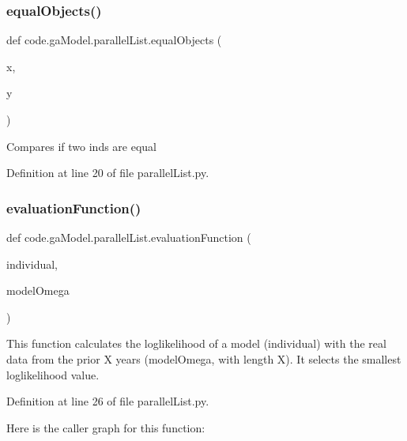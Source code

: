 \subsubsection{\texorpdfstring{equal\+Objects()}{equalObjects()}}
{\footnotesize\ttfamily def code.\+ga\+Model.\+parallel\+List.\+equal\+Objects (\begin{DoxyParamCaption}\item[{}]{x,  }\item[{}]{y }\end{DoxyParamCaption})}

\begin{DoxyVerb}Compares if two inds are equal
\end{DoxyVerb}
 

Definition at line 20 of file parallel\+List.\+py.

\mbox{\label{namespacecode_1_1ga_model_1_1parallel_list_a81a9ac8cf875307d1e367fb559d57ec0}} 
\subsubsection{\texorpdfstring{evaluation\+Function()}{evaluationFunction()}}
{\footnotesize\ttfamily def code.\+ga\+Model.\+parallel\+List.\+evaluation\+Function (\begin{DoxyParamCaption}\item[{}]{individual,  }\item[{}]{model\+Omega }\end{DoxyParamCaption})}

\begin{DoxyVerb}This function calculates the loglikelihood of a model (individual) with 
the real data from the prior X years (modelOmega, with length X).
It selects the smallest loglikelihood value.
\end{DoxyVerb}
 

Definition at line 26 of file parallel\+List.\+py.

Here is the caller graph for this function\+:
\mbox{\label{namespacecode_1_1ga_model_1_1parallel_list_a56992cede06ab5b5142f054b0a6a04dd}} 
